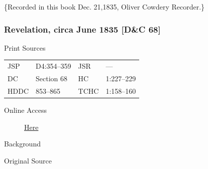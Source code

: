 				\{Recorded in this book Dec. 21,1835, Oliver Cowdery Recorder.\}
				
		\subsubsection{Revelation, circa June 1835 [D\&C 68]}
			\label{EMS-1835-JS-CIR-JUN-1835}
			
			\begin{description}
				\item[Print Sources]
			\end{description}

				\begin{tabular}{p{0.5in}p{1in}p{0.5in}p{1in}}
				JSP	 	& D4:354--359		& JSR 		& --- \\
				DC	 	& Section 68 		& HC 		& 1:227--229 \\
				HDDC 	& 853--865			& TCHC 		& 1:158--160 \\
				\end{tabular}
			
			\begin{description}
				\item[Online Access] \href{https://www.josephsmithpapers.org/paper-summary/revelation-circa-june-1835-dc-68/1}{Here}
			\end{description}
			
			\begin{description}
				\item[Background]
			\end{description}
			
			
			\begin{description}
				\item[Original Source]
			\end{description}
			
			
